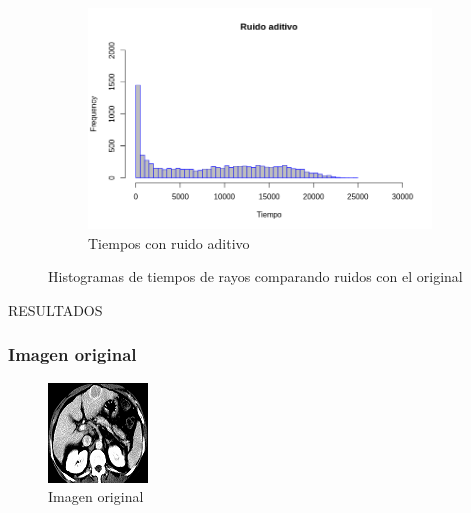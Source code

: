 \documentclass[11pt]{beamer}
\begin{document}
\begin{frame}
\begin{figure}[H]
\begin{subfigure}[h]{0.45\textwidth}
            \includegraphics[width=\textwidth]{img/ruidoAditivo.png}
            \caption{Tiempos con ruido aditivo}
            \label{fig:Tiempos con ruido aditivo}
        \end{subfigure}
        
        \caption{Histogramas de tiempos de rayos comparando ruidos con el original}
    \end{figure}
\end{frame}





\begin{frame}{RESULTADOS}
    \frametitle{Imagen original}
    \begin{figure}
    \centering
            \includegraphics[scale=1]{img/tomo.png}
            \caption{Imagen original}
            \label{fig:original}
    \end{figure}
\end{frame}
\end{document}
